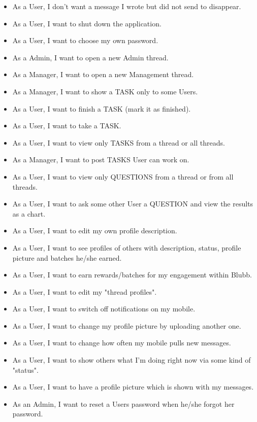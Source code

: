 \documentclass[12pt,a4paper,oneside]{report}
\begin{document}
\begin{itemize}
     \item As a User, I don't want a message I wrote but did not send to disappear.
     \item As a User, I want to shut down the application. 
     \item As a User, I want to choose my own password. 
     \item As a Admin, I want to open a new Admin thread.
     \item As a Manager, I want to open a new Management thread. 
     \item As a Manager, I want to show a TASK only to some Users. 
     \item As a User, I want to finish a TASK (mark it as finished). 
     \item As a User, I want to take a TASK.
     \item As a User, I want to view only TASKS from a thread or all threads.
     \item As a Manager, I want to post TASKS User can work on. 
     \item As a User, I want to view only QUESTIONS from a thread or from all threads. 
     \item As a User, I want to ask some other User a QUESTION and view the results as a chart. 
     \item As a User, I want to edit my own profile description. 
     \item As a User, I want to see profiles of others with description, status, profile picture and batches he/she earned.
     \item As a User, I want to earn rewards/batches for my engagement within Blubb.
     \item As a User, I want to edit my "thread profiles".
     \item As a User, I want to switch off notifications on my mobile.
     \item As a User, I want to change my profile picture by uploading another one.
     \item As a User, I want to change how often my mobile pulls new messages.
     \item As a User, I want to show others what I'm doing right now via some kind of "status".
     \item As a User, I want to have a profile picture which is shown with my messages.
     \item As an Admin, I want to reset a Users password when he/she forgot her password.

\end{itemize}
\end{document}
